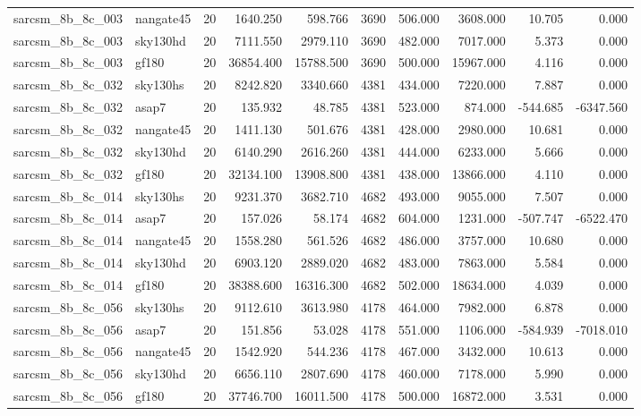 \documentclass{article}
\begin{document}
\begin{longtable}{llrrrrrrrr}
sarcsm\_8b\_8c\_003 & nangate45 & 20 & 1640.250 & 598.766 & 3690 & 506.000 & 3608.000 & 10.705 & 0.000 \\
sarcsm\_8b\_8c\_003 & sky130hd & 20 & 7111.550 & 2979.110 & 3690 & 482.000 & 7017.000 & 5.373 & 0.000 \\
sarcsm\_8b\_8c\_003 & gf180 & 20 & 36854.400 & 15788.500 & 3690 & 500.000 & 15967.000 & 4.116 & 0.000 \\
sarcsm\_8b\_8c\_032 & sky130hs & 20 & 8242.820 & 3340.660 & 4381 & 434.000 & 7220.000 & 7.887 & 0.000 \\
sarcsm\_8b\_8c\_032 & asap7 & 20 & 135.932 & 48.785 & 4381 & 523.000 & 874.000 & -544.685 & -6347.560 \\
sarcsm\_8b\_8c\_032 & nangate45 & 20 & 1411.130 & 501.676 & 4381 & 428.000 & 2980.000 & 10.681 & 0.000 \\
sarcsm\_8b\_8c\_032 & sky130hd & 20 & 6140.290 & 2616.260 & 4381 & 444.000 & 6233.000 & 5.666 & 0.000 \\
sarcsm\_8b\_8c\_032 & gf180 & 20 & 32134.100 & 13908.800 & 4381 & 438.000 & 13866.000 & 4.110 & 0.000 \\
sarcsm\_8b\_8c\_014 & sky130hs & 20 & 9231.370 & 3682.710 & 4682 & 493.000 & 9055.000 & 7.507 & 0.000 \\
sarcsm\_8b\_8c\_014 & asap7 & 20 & 157.026 & 58.174 & 4682 & 604.000 & 1231.000 & -507.747 & -6522.470 \\
sarcsm\_8b\_8c\_014 & nangate45 & 20 & 1558.280 & 561.526 & 4682 & 486.000 & 3757.000 & 10.680 & 0.000 \\
sarcsm\_8b\_8c\_014 & sky130hd & 20 & 6903.120 & 2889.020 & 4682 & 483.000 & 7863.000 & 5.584 & 0.000 \\
sarcsm\_8b\_8c\_014 & gf180 & 20 & 38388.600 & 16316.300 & 4682 & 502.000 & 18634.000 & 4.039 & 0.000 \\
sarcsm\_8b\_8c\_056 & sky130hs & 20 & 9112.610 & 3613.980 & 4178 & 464.000 & 7982.000 & 6.878 & 0.000 \\
sarcsm\_8b\_8c\_056 & asap7 & 20 & 151.856 & 53.028 & 4178 & 551.000 & 1106.000 & -584.939 & -7018.010 \\
sarcsm\_8b\_8c\_056 & nangate45 & 20 & 1542.920 & 544.236 & 4178 & 467.000 & 3432.000 & 10.613 & 0.000 \\
sarcsm\_8b\_8c\_056 & sky130hd & 20 & 6656.110 & 2807.690 & 4178 & 460.000 & 7178.000 & 5.990 & 0.000 \\
sarcsm\_8b\_8c\_056 & gf180 & 20 & 37746.700 & 16011.500 & 4178 & 500.000 & 16872.000 & 3.531 & 0.000 \\

\end{longtable}
\end{document}
